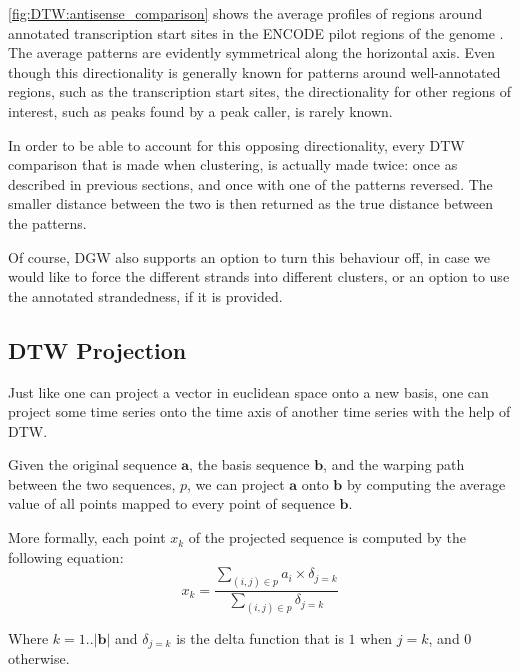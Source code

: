\documentclass[parskip]{cs4rep}
\begin{document}
\autoref{fig:DTW:antisense_comparison} shows the average profiles of regions around annotated transcription start sites in the ENCODE pilot regions of the genome \cite{ENCODEProjectConsortium:2007fu}. The average patterns are evidently symmetrical along the horizontal axis.
Even though this directionality is generally known for patterns around well-annotated regions, such as the transcription start sites, the directionality for other regions of interest, such as peaks found by a peak caller, is rarely known.  

In order to be able to account for this opposing directionality, every DTW comparison that is made when clustering, is actually made twice: once as described in previous sections, and once with one of the patterns reversed. The smaller distance between the two is then returned as the true distance between the patterns. 

Of course, DGW also supports an option to turn this behaviour off, in case we would like to force the different strands into different clusters, or an option to use the annotated strandedness, if it is provided.

\subsection{DTW Projection}
\label{sec:dtw-projection}

Just like one can project a vector in euclidean space onto a new basis, one can project some time series onto the time axis of another time series with the help of DTW. 

Given the original sequence $\mathbf{a}$, the basis sequence $\mathbf{b}$, and the warping path between the two sequences, $p$, we can project $\mathbf{a}$ onto $\mathbf{b}$ by computing the average value of all points mapped to every point of sequence $\mathbf{b}$.

More formally, each point $x_k$ of the projected sequence is computed by the following equation:
\begin{equation}
    x_k =  \frac{\sum_{(i,j) \in p} a_i \times \delta_{j=k}}{\sum_{(i,j) \in p} \delta_{j=k}} 
\end{equation}

Where $k=1..|\mathbf{b}|$ and $\delta_{j=k}$ is the delta function that is $1$ when $j=k$, and $0$ otherwise.
\end{document}
